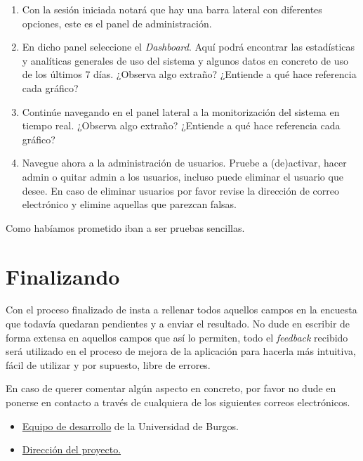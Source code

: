 \documentclass[
	12pt,
	spanish
]{article}
\makeatletter
\newcommand{\mailUBU}{mailto:dpr1005@alu.ubu.es}
\newcommand{\mailPersonal}{mailto:dani.pr21@gmail.com}
\makeatother
\begin{document}
\begin{enumerate}
\item Con la sesión iniciada notará que hay una barra lateral con diferentes opciones, este es el panel de administración.
\item En dicho panel seleccione el \textit{Dashboard}. Aquí podrá encontrar las estadísticas y analíticas generales de uso del sistema y algunos datos en concreto de uso de los últimos 7 días. ¿Observa algo extraño? ¿Entiende a qué hace referencia cada gráfico?
\item Continúe navegando en el panel lateral a la monitorización del sistema en tiempo real. ¿Observa algo extraño? ¿Entiende a qué hace referencia cada gráfico?
\item Navegue ahora a la administración de usuarios. Pruebe a (de)activar, hacer admin o quitar admin a los usuarios, incluso puede eliminar el usuario que desee. En caso de eliminar usuarios por favor revise la dirección de correo electrónico y elimine aquellas que parezcan falsas.
\end{enumerate}

Como habíamos prometido iban a ser pruebas sencillas.

\pagebreak
\section{Finalizando}\label{sec:fin}

Con el proceso finalizado de insta a rellenar todos aquellos campos en la encuesta que todavía quedaran pendientes y a enviar el resultado. No dude en escribir de forma extensa en aquellos campos que así lo permiten, todo el \textit{feedback} recibido será utilizado en el proceso de mejora de la aplicación para hacerla más intuitiva, fácil de utilizar y por supuesto, libre de errores.

En caso de querer comentar algún aspecto en concreto, por favor no dude en ponerse en contacto a través de cualquiera de los siguientes correos electrónicos.
\begin{itemize}
\item \href{\mailUBU}{Equipo de desarrollo} de la Universidad de Burgos.
\item \href{\mailPersonal}{Dirección del proyecto.}
\end{itemize}
\end{document}
